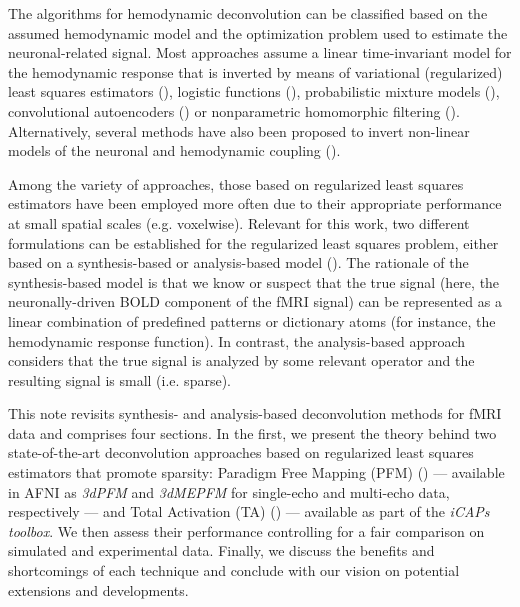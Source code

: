 The algorithms for hemodynamic deconvolution can be classified based on the assumed hemodynamic model and the optimization problem used to estimate the neuronal-related signal. Most approaches assume a linear time-invariant model for the hemodynamic response that is inverted by means of variational (regularized) least squares estimators (\citealt{Glover1999DeconvolutionImpulseResponse,Gitelman2003Modelingregionalpsychophysiologic,Gaudes2010Detectioncharacterizationsingle,Gaudes2012Structuredsparsedeconvolution,Gaudes2013Paradigmfreemapping,CaballeroGaudes2019deconvolutionalgorithmmulti,HernandezGarcia2011Neuronaleventdetection,Karahanoglu2013TotalactivationfMRI,Cherkaoui2019SparsitybasedBlind,Costantini2021ParadigmFreeRegularization,Huetel2021Hemodynamicmatrixfactorization}), logistic functions (\citealt{Bush2013Decodingneuralevents,Bush2015deconvolutionbasedapproach,Loula2018DecodingfMRIactivity}), probabilistic mixture models (\citealt{Pidnebesna2019EstimatingSparseNeuronal}), convolutional autoencoders (\citealt{Huetel2018NeuralActivationEstimation}) or nonparametric homomorphic filtering (\citealt{Sreenivasan2015NonparametricHemodynamicDeconvolution}). Alternatively, several methods have also been proposed to invert non-linear models of the neuronal and hemodynamic coupling (\citealt{Riera2004statespacemodel,Friston2008DEMvariationaltreatment,Havlicek2011Dynamicmodelingneuronal,Aslan2016Jointstateparameter,Madi2017HybridCubatureKalman,ruizeuler2018nonlinear}). 

Among the variety of approaches, those based on regularized least squares estimators have been employed more often due to their appropriate performance at small spatial scales (e.g. voxelwise). Relevant for this work, two different formulations can be established for the regularized least squares problem, either based on a synthesis-based or analysis-based model (\citealt{Elad2007Analysisversussynthesis,ortelli2019synthesis}). The rationale of the synthesis-based model is that we know or suspect that the true signal (here, the neuronally-driven BOLD component of the fMRI signal) can be represented as a linear combination of predefined patterns or dictionary atoms (for instance, the hemodynamic response function). In contrast, the analysis-based approach considers that the true signal is analyzed by some relevant operator and the resulting signal is small (i.e. sparse).  

This note revisits synthesis- and analysis-based deconvolution methods for fMRI data and comprises four sections. In the first, we present the theory behind two state-of-the-art deconvolution approaches based on regularized least squares estimators that promote sparsity: Paradigm Free Mapping (PFM) (\citealt{Gaudes2013Paradigmfreemapping}) --- available in AFNI as \textit{3dPFM} and \textit{3dMEPFM} for single-echo and multi-echo data, respectively --- and Total Activation (TA) (\citealt{Karahanoglu2013TotalactivationfMRI}) --- available as part of the \textit{iCAPs toolbox}. We then assess their performance controlling for a fair comparison on simulated and experimental data. Finally, we discuss the benefits and shortcomings of each technique and conclude with our vision on potential extensions and developments.
